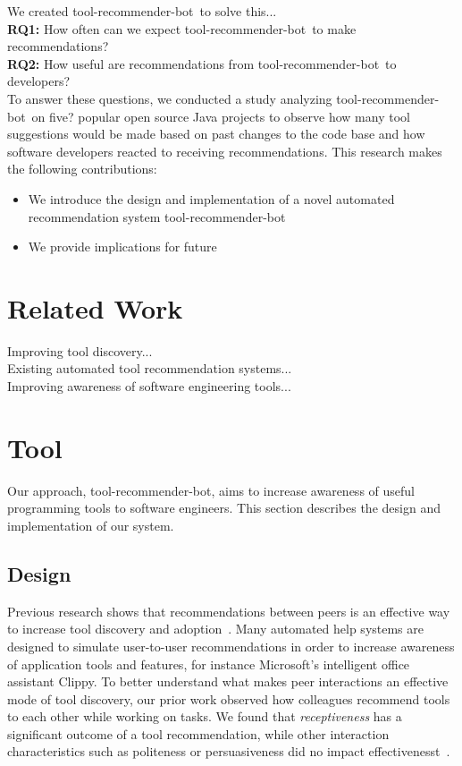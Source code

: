 \documentclass[conference]{IEEEtran}
\newcommand{\tool}{tool-recommender-bot}
\begin{document}
We created \tool~to solve this... \\

\noindent
\textbf{RQ1:} How often can we expect \tool~to make recommendations?  \\
\textbf{RQ2:} How useful are recommendations from \tool~to developers?  \\

To answer these questions, we conducted a study analyzing \tool~on five? popular open source Java projects to observe how many tool suggestions would be made based on past changes to the code base and how software developers reacted to receiving recommendations. This research makes the following contributions:\\

\begin{itemize}
\item We introduce the design and implementation of a novel automated recommendation system \tool~
\item We provide implications for future
\end{itemize}

\section{Related Work}

Improving tool discovery...\\

Existing automated tool recommendation systems...\\

Improving awareness of software engineering tools...\\

\section{Tool}
Our approach, \tool, aims to increase awareness of useful programming tools to software engineers. This section describes the design and implementation of our system.

\subsection{Design}
Previous research shows that recommendations between peers is an effective way to increase tool discovery and adoption~\cite{Murphy-HillPeerInteraction}. Many automated help systems are designed to simulate user-to-user recommendations in order to increase awareness of application tools and features, for instance Microsoft's intelligent office assistant Clippy. To better understand what makes peer interactions an effective mode of tool discovery, our prior work observed how colleagues recommend tools to each other while working on tasks. We found that \emph{receptiveness} has a significant outcome of a tool recommendation, while other interaction characteristics such as politeness or persuasiveness did no impact effectivenesst~\cite{vlhcc17}. 
\end{document}
